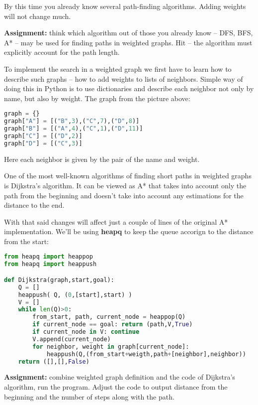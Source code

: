 By this time you already know several path-finding algorithms. 
Adding weights will not change much.

\begin{tcolorbox}
\textbf{Assignment:} think which algorithm out of those you already
know -- DFS, BFS, A* -- may be used for finding paths in weighted graphs.
Hit -- the algorithm must explicitly account for the path length.
\end{tcolorbox}

To implement the search in a weighted graph we first have to learn
how to describe such graphs -- how to add weights to lists of
neighbors. Simple way of doing this in Python is to use dictionaries
and describe each neighbor not only by name, but also by weight. The graph
from the picture above:

\begin{lstlisting}[language=Python,style=codelst2,caption={Python: weighted graphs}]
graph = {}
graph["A"] = [("B",3),("C",7),("D",8)]
graph["B"] = [("A",4),("C",1),("D",11)]
graph["C"] = [("D",2)]
graph["D"] = [("C",3)]
\end{lstlisting}
Here each neighbor is given by the pair of the name and weight.

One of the most well-known algorithms of finding short paths in
weighted graphs is Dijkstra's algorithm. It can be viewed as A*
that takes into account only the path from the beginning and
doesn't take into account any estimations for the distance to the end.

With that said changes will affect just a couple of lines of
the original A* implementation. We'll be using \textbf{heapq}
to keep the queue accorign to the distance from the start:

\begin{lstlisting}[language=Python,style=codelst2,caption={Python: Dijkstra search}]
from heapq import heappop
from heapq import heappush

def Dijkstra(graph,start,goal):
    Q = []
    heappush( Q, (0,[start],start) )
    V = []
    while len(Q)>0:
        from_start, path, current_node = heappop(Q)
        if current_node == goal: return (path,V,True)
        if current_node in V: continue
        V.append(current_node)
        for neighbor, weight in graph[current_node]:
            heappush(Q,(from_start+weigth,path+[neighbor],neighbor))
    return ([],[],False)
\end{lstlisting}

\begin{tcolorbox}
\textbf{Assignment:} combine weighted graph definition and the code
of Dijkstra's algorithm, run the program. Adjust the code to output
distance from the beginning and the number of steps along with the path.
\end{tcolorbox}

